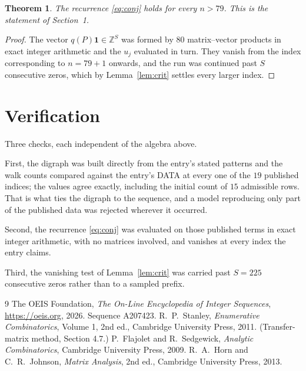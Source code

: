 \documentclass[11pt,a4paper]{article}
\theoremstyle{plain}
\newtheorem{theorem}{Theorem}
\theoremstyle{definition}
\begin{document}
\begin{theorem}
The recurrence \eqref{eq:conj} holds for every $n>79$. This is the statement of
Section~1.
\end{theorem}

\begin{proof}
The vector $q(P)\mathbf{1}\in\mathbb{Z}^{S}$ was formed by $80$ matrix--vector
products in exact integer arithmetic and the $u_j$ evaluated in turn. They vanish from the
index corresponding to $n=79+1$ onwards, and the run was continued past $S$ consecutive
zeros, which by Lemma~\ref{lem:crit} settles every larger index.
\end{proof}

\section{Verification}

Three checks, each independent of the algebra above.

First, the digraph was built directly from the entry's stated patterns and the walk counts
compared against the entry's DATA at every one of the $19$ published indices; the
values agree exactly, including the initial count of $15$ admissible rows. That is
what ties the digraph to the sequence, and a model reproducing only part of the published
data was rejected wherever it occurred.

Second, the recurrence \eqref{eq:conj} was evaluated on those published terms in exact
integer arithmetic, with no matrices involved, and vanishes at every index the entry claims.

Third, the vanishing test of Lemma~\ref{lem:crit} was carried past $S=225$ consecutive
zeros rather than to a sampled prefix.

\begin{thebibliography}{9}
 The OEIS Foundation, \emph{The On-Line Encyclopedia of Integer
Sequences}, \url{https://oeis.org}, 2026. Sequence A207423.
 R.~P.~Stanley, \emph{Enumerative Combinatorics}, Volume 1, 2nd ed.,
Cambridge University Press, 2011. (Transfer-matrix method, Section 4.7.)
 P.~Flajolet and R.~Sedgewick, \emph{Analytic Combinatorics}, Cambridge
University Press, 2009.
 R.~A.~Horn and C.~R.~Johnson, \emph{Matrix Analysis}, 2nd ed., Cambridge
University Press, 2013.
\end{thebibliography}
\end{document}

